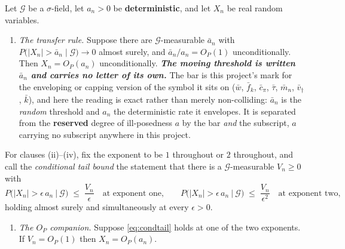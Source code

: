 \begin{lemma}\label{lem:pconv}
Let $\mathcal G$ be a $\sigma$-field, let $a_n>0$ be \textbf{deterministic}, and let $X_n$ be real random
variables.
\begin{enumerate}
\item[(i)] \emph{The transfer rule.} Suppose there are $\mathcal G$-measurable $\bar a_n$ with
$P\big(|X_n|>\bar a_n\mid\mathcal G\big)\to0$ almost surely, and $\bar a_n/a_n=O_P(1)$ unconditionally.
Then $X_n=O_P(a_n)$ unconditionally.
\emph{\textbf{The moving threshold is written $\bar a_n$ and carries no letter of its own.}} The bar is
this project's mark for the enveloping or capping version of the symbol it sits on ($\bar w$,
$\bar f_k$, $\bar c_\pi$, $\bar\tau$, $\bar m_n$, $\bar v_\dagger$, $\bar k$), and here the reading is
exact rather than merely non-colliding: $\bar a_n$ is the \emph{random} threshold and $a_n$ the
deterministic rate it envelopes. It is separated from the \textbf{reserved} degree of ill-posedness $a$
by the bar \emph{and} the subscript, $a$ carrying no subscript anywhere in this project.
\end{enumerate}
For clauses (ii)--(iv), fix the exponent to be $1$ throughout or $2$ throughout, and call the
\emph{conditional tail bound} the statement that there is a $\mathcal G$-measurable $V_n\ge0$ with
\begin{equation}\label{eq:condtail}
P\big(|X_n|>\epsilon\,a_n\ \big|\ \mathcal G\big)\;\le\;\frac{V_n}{\epsilon}
\quad\text{at exponent one,}\qquad
P\big(|X_n|>\epsilon\,a_n\ \big|\ \mathcal G\big)\;\le\;\frac{V_n}{\epsilon^{2}}
\quad\text{at exponent two,}
\end{equation}
holding almost surely and simultaneously at every $\epsilon>0$.
\begin{enumerate}
\item[(ii)] \emph{The $O_P$ companion.} Suppose \eqref{eq:condtail} holds at one of the two exponents. If
$V_n=O_P(1)$ then $X_n=O_P(a_n)$.

\end{enumerate}
\end{lemma}
